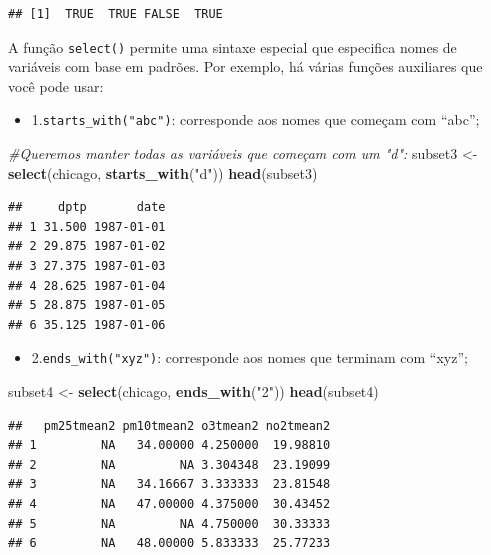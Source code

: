 \documentclass[]{book}
\newenvironment{Shaded}{\begin{snugshade}}{\end{snugshade}}
\newcommand{\CommentTok}[1]{\textcolor[rgb]{0.56,0.35,0.01}{\textit{#1}}}
\newcommand{\KeywordTok}[1]{\textcolor[rgb]{0.13,0.29,0.53}{\textbf{#1}}}
\newcommand{\NormalTok}[1]{#1}
\newcommand{\StringTok}[1]{\textcolor[rgb]{0.31,0.60,0.02}{#1}}
\providecommand{\tightlist}{%
  \setlength{\itemsep}{0pt}\setlength{\parskip}{0pt}}
\begin{document}
\begin{verbatim}
## [1]  TRUE  TRUE FALSE  TRUE
\end{verbatim}

A função \texttt{select()} permite uma sintaxe especial que especifica nomes de variáveis com base em padrões. Por exemplo, há várias funções auxiliares que você pode usar:

\begin{itemize}
\tightlist
\item
  1.\texttt{starts\_with("abc")}: corresponde aos nomes que começam com ``abc'';
\end{itemize}

\begin{Shaded}
\begin{Highlighting}[]
\CommentTok{#Queremos manter todas as variáveis que começam com um "d":}
\NormalTok{subset3 <-}\StringTok{ }\KeywordTok{select}\NormalTok{(chicago, }\KeywordTok{starts_with}\NormalTok{(}\StringTok{"d"}\NormalTok{))}
\KeywordTok{head}\NormalTok{(subset3)}
\end{Highlighting}
\end{Shaded}

\begin{verbatim}
##     dptp       date
## 1 31.500 1987-01-01
## 2 29.875 1987-01-02
## 3 27.375 1987-01-03
## 4 28.625 1987-01-04
## 5 28.875 1987-01-05
## 6 35.125 1987-01-06
\end{verbatim}

\begin{itemize}
\tightlist
\item
  2.\texttt{ends\_with("xyz")}: corresponde aos nomes que terminam com ``xyz'';
\end{itemize}

\begin{Shaded}
\begin{Highlighting}[]
\NormalTok{subset4 <-}\StringTok{ }\KeywordTok{select}\NormalTok{(chicago, }\KeywordTok{ends_with}\NormalTok{(}\StringTok{"2"}\NormalTok{))}
\KeywordTok{head}\NormalTok{(subset4)}
\end{Highlighting}
\end{Shaded}

\begin{verbatim}
##   pm25tmean2 pm10tmean2 o3tmean2 no2tmean2
## 1         NA   34.00000 4.250000  19.98810
## 2         NA         NA 3.304348  23.19099
## 3         NA   34.16667 3.333333  23.81548
## 4         NA   47.00000 4.375000  30.43452
## 5         NA         NA 4.750000  30.33333
## 6         NA   48.00000 5.833333  25.77233
\end{verbatim}
\end{document}
